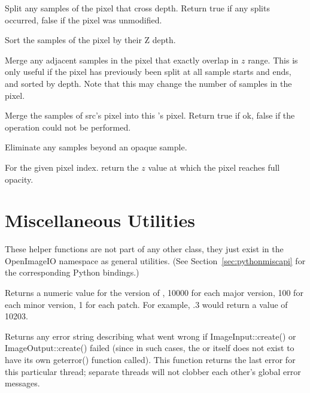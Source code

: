 Split any samples of the pixel that cross {\cf depth}. Return {\cf true} if
any splits occurred, {\cf false} if the pixel was unmodified.
\apiend

Sort the samples of the pixel by their Z depth.
\apiend

Merge any adjacent samples in the pixel that exactly overlap in $z$
range. This is only useful if the pixel has previously been split at
all sample starts and ends, and sorted by depth. Note that this may change
the number of samples in the pixel.
\apiend

Merge the samples of {\cf src}'s pixel into this \DeepData's pixel.
Return {\cf true} if ok, {\cf false} if the operation could not be
performed.
\apiend

Eliminate any samples beyond an opaque sample.
\apiend

For the given pixel index. return the $z$ value at which the pixel reaches
full opacity.
\apiend


\section{Miscellaneous Utilities}
\label{sec:miscapi}

These helper functions are not part of any other \OpenImageIO class,
they just exist in the {\cf OpenImageIO} namespace as general utilities.
(See Section~\ref{sec:pythonmiscapi} for the corresponding Python
bindings.)

Returns a numeric value for the version of \product, 10000 for each
major version, 100 for each minor version, 1 for each patch.  For
example, .3 would return a value of 10203.
\apiend

Returns any error string describing what went wrong if 
{\cf ImageInput::create()} or \\ {\cf ImageOutput::create()} failed
(since in such cases, the \ImageInput or \ImageOutput itself does 
not exist to have its own {\cf geterror()} function called).
This function returns the last error
for this particular thread; separate threads will not clobber each
other's global error messages.
\apiend


